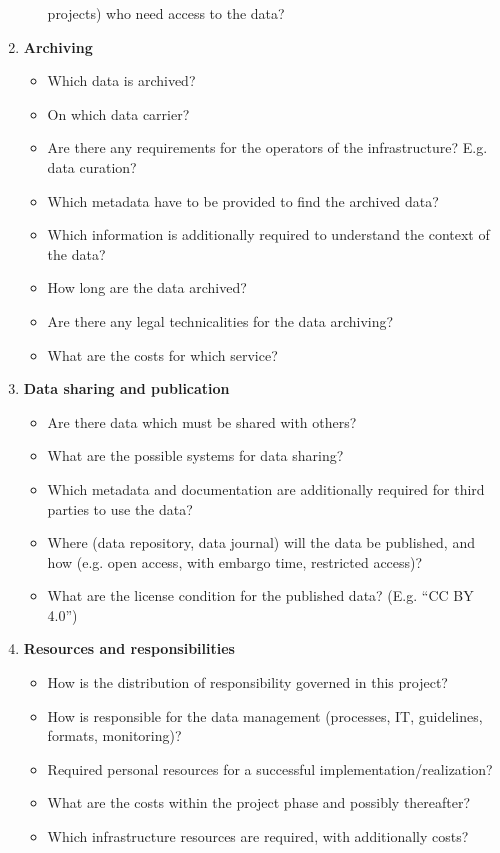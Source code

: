 \begin{enumerate}[start=0, label=\textbf{\arabic*})]
\begin{itemize}
                projects) who need access to the data?
        \end{itemize}
  \item \textbf{Archiving}
        \begin{itemize}
          \item Which data is archived?
          \item On which data carrier?
          \item Are there any requirements for the operators of the
                infrastructure? E.g. data curation?
          \item Which metadata have to be provided to find the archived data?
          \item Which information is additionally required to understand the
                context of the data?
          \item How long are the data archived?
          \item Are there any legal technicalities for the data archiving?
          \item What are the costs for which service?
        \end{itemize}
  \item \textbf{Data sharing and publication}
        \begin{itemize}
          \item Are there data which must be shared with others?
          \item What are the possible systems for data sharing?
          \item Which metadata and documentation are additionally required for
                third parties to use the data?
          \item Where (data repository, data journal) will the data be
                published, and how (e.g. open access, with embargo time,
                restricted access)?
          \item What are the license condition for the published data?
                (E.g. “CC BY 4.0”)
        \end{itemize}
  \item \textbf{Resources and responsibilities}
        \begin{itemize}
          \item How is the distribution of responsibility governed in this project?
          \item How is responsible for the data management (processes, IT,
                guidelines, formats, monitoring)?
          \item Required personal resources for a successful
                implementation/realization?
          \item What are the costs within the project phase and
                possibly thereafter?
          \item Which infrastructure resources are required, with additionally
                costs?
        \end{itemize}
\end{enumerate}
